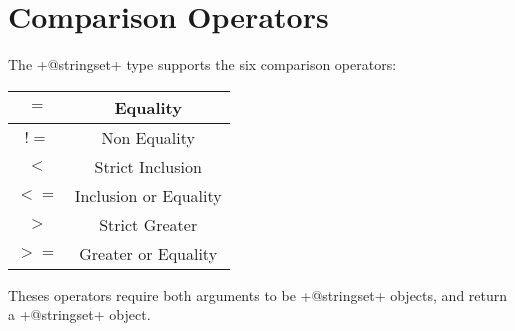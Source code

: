 \section{Comparison Operators}

The \ggst+@stringset+ type supports the six comparison operators:\newline

\begin{tabular}{|c|c|}
\hline
$=$ & Equality \\
\hline
$!=$ & Non Equality \\
\hline
$<$  & Strict Inclusion \\
\hline
$<=$  & Inclusion or Equality \\
\hline
$>$  & Strict Greater \\
\hline
$>=$  & Greater or Equality \\
\hline
\end{tabular}

Theses operators require both arguments to be \ggst+@stringset+ objects, and return a \ggst+@stringset+ object.


